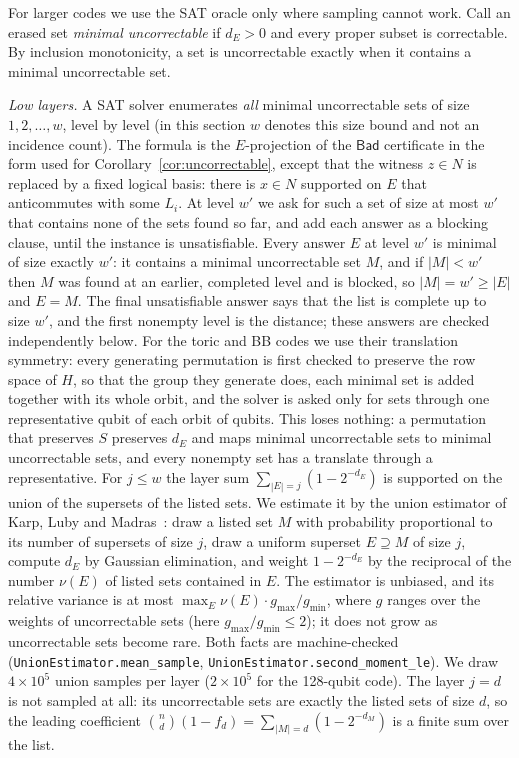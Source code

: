 \documentclass[11pt]{article}
\theoremstyle{remark}
\newcommand{\Bad}{\mathsf{Bad}}
\newcommand{\lean}[1]{\texttt{#1}}
\begin{document}
For larger codes we use the SAT oracle only where sampling cannot work.
Call an erased set \emph{minimal uncorrectable} if \(d_E>0\) and every
proper subset is correctable. By inclusion monotonicity, a set is
uncorrectable exactly when it contains a minimal uncorrectable set.

\emph{Low layers.} A SAT solver enumerates \emph{all} minimal
uncorrectable sets of size \(1,2,\ldots,w\), level by level (in this
section \(w\) denotes this size bound and not an incidence count). The
formula
is the \(E\)-projection of the \(\Bad\) certificate in the form used for
Corollary~\ref{cor:uncorrectable}, except that the witness \(z\in N\) is
replaced by a fixed logical basis: there is \(x\in N\) supported on
\(E\) that anticommutes with some \(L_i\). At level \(w'\) we ask for
such a set of size at most \(w'\) that contains none of the sets found
so far, and add each answer as a blocking clause, until the instance is
unsatisfiable. Every answer \(E\) at level \(w'\) is minimal of size
exactly \(w'\): it contains a minimal uncorrectable set \(M\), and if
\(|M|<w'\) then \(M\) was found at an earlier, completed level and is
blocked, so \(|M|=w'\ge|E|\) and \(E=M\). The final unsatisfiable answer
says that the list is complete up to size \(w'\), and the first nonempty
level is the distance; these answers are checked independently below. For the toric and BB codes we use their
translation symmetry: every generating permutation is first checked to
preserve the row space of \(H\), so that the group they generate does,
each minimal set is added together with
its whole orbit, and the solver is asked only for sets through one
representative qubit of each orbit of qubits. This loses nothing: a
permutation that preserves \(S\) preserves \(d_E\) and maps minimal
uncorrectable sets to minimal uncorrectable sets, and every nonempty set
has a translate through a representative. For \(j\le w\) the layer sum
\(\sum_{|E|=j}(1-2^{-d_E})\) is supported on the union of the supersets
of the listed sets. We estimate it by the union estimator of Karp, Luby
and Madras~\cite{karplubymadras1989}: draw a listed set \(M\) with
probability proportional to its number of supersets of size \(j\), draw
a uniform superset \(E\supseteq M\) of size \(j\), compute \(d_E\) by
Gaussian elimination, and weight \(1-2^{-d_E}\) by the reciprocal of the
number \(\nu(E)\) of listed sets contained in \(E\). The estimator is
unbiased, and its relative variance is at most
\(\max_E\nu(E)\cdot g_{\max}/g_{\min}\), where \(g\) ranges over the
weights of uncorrectable sets (here \(g_{\max}/g_{\min}\le2\)); it does
not grow as uncorrectable sets become rare. Both facts are
machine-checked (\lean{UnionEstimator.mean\_sample},
\lean{UnionEstimator.second\_moment\_le}). We draw \(4\times10^5\)
union samples per layer (\(2\times10^5\) for the 128-qubit code). The
layer \(j=d\) is not
sampled at all: its uncorrectable sets are exactly the listed sets of
size \(d\), so the leading coefficient
\(\binom nd(1-f_d)=\sum_{|M|=d}(1-2^{-d_M})\) is a finite sum over the
list.
\end{document}
